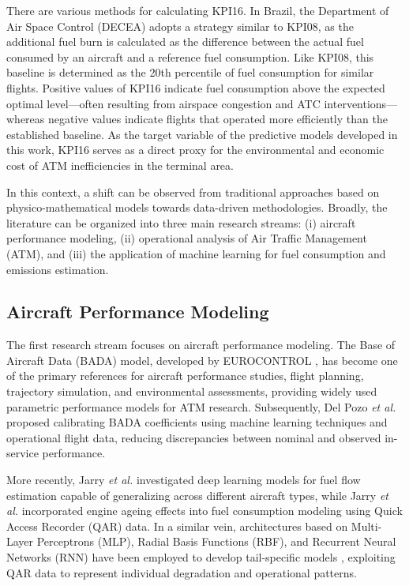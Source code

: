 There are various methods for calculating KPI16. In Brazil, the Department of Air Space Control (DECEA) adopts a strategy similar to KPI08, as the additional fuel burn is calculated as the difference between the actual fuel consumed by an aircraft and a reference fuel consumption. Like KPI08, this baseline is determined as the 20th percentile of fuel consumption for similar flights. Positive values of KPI16 indicate fuel consumption above the expected optimal level—often resulting from airspace congestion and ATC interventions—whereas negative values indicate flights that operated more efficiently than the established baseline. As the target variable of the predictive models developed in this work, KPI16 serves as a direct proxy for the environmental and economic cost of ATM inefficiencies in the terminal area.

In this context, a shift can be observed from traditional approaches based on physico-mathematical models towards data-driven methodologies. Broadly, the literature can be organized into three main research streams: (i) aircraft performance modeling, (ii) operational analysis of Air Traffic Management (ATM), and (iii) the application of machine learning for fuel consumption and emissions estimation.

\subsection{Aircraft Performance Modeling}
The first research stream focuses on aircraft performance modeling. The Base of Aircraft Data (BADA) model, developed by EUROCONTROL \cite{nuic2010bada}, has become one of the primary references for aircraft performance studies, flight planning, trajectory simulation, and environmental assessments, providing widely used parametric performance models for ATM research. Subsequently, Del Pozo \textit{et al.} \cite{delpozo2022bada} proposed calibrating BADA coefficients using machine learning techniques and operational flight data, reducing discrepancies between nominal and observed in-service performance.

More recently, Jarry \textit{et al.} \cite{jarry2024generalization} investigated deep learning models for fuel flow estimation capable of generalizing across different aircraft types, while Jarry \textit{et al.} \cite{jarry2025ageing} incorporated engine ageing effects into fuel consumption modeling using Quick Access Recorder (QAR) data. In a similar vein, architectures based on Multi-Layer Perceptrons (MLP), Radial Basis Functions (RBF), and Recurrent Neural Networks (RNN) have been employed to develop tail-specific models \cite{hetherington2025tail}, exploiting QAR data to represent individual degradation and operational patterns.

